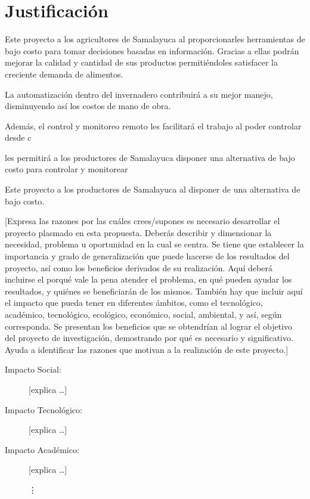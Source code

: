 \section{Justificación}


Este proyecto a los agricultores de Samalayuca al proporcionarles herramientas de bajo costo para tomar decisiones basadas en información. 
Gracias a ellas podrán mejorar la calidad y cantidad de sus productos permitiéndoles satisfacer la creciente demanda de alimentos.

La automatización dentro del invernadero contribuirá a su mejor manejo, disminuyendo así los costos de mano de obra.



Además, el control y 
monitoreo remoto les facilitará el trabajo al poder controlar desde c


 les permitirá a los productores de Samalayuca disponer una alternativa de bajo costo para controlar y monitorear 

Este proyecto a los productores de Samalayuca al disponer de una alternativa de bajo costo.

[Expresa las razones por las cuáles crees/supones es necesario desarrollar el proyecto plasmado en esta propuesta. 
Deberás describir y dimensionar la necesidad, problema u oportunidad en la cual se centra. 
Se tiene que establecer la importancia y grado de generalización que puede hacerse de los resultados del proyecto, así como los beneficios derivados de su realización. 
Aquí deberá incluirse el porqué vale la pena atender el problema, en qué pueden ayudar los resultados, y quiénes se beneficiarán de los mismos. 
También hay que incluir aquí el impacto que pueda tener en diferentes ámbitos, como el  tecnológico, académico, tecnológico, ecológico, económico, social, ambiental, y así, según corresponda. 
Se presentan los beneficios que se obtendrían al lograr el objetivo del proyecto de investigación, demostrando por qué es necesario y significativo. 
Ayuda a identificar las razones que motivan a la realización de este proyecto.]
\begin{description}
\item [Impacto Social:] [explica
\dots]


\item [Impacto Tecnológico:]
[explica
\dots]

\item [Impacto Académico:] 
[explica \dots]

\vdots


\end{description}